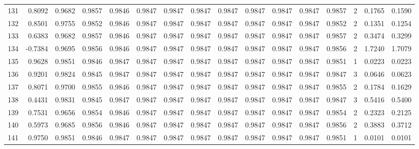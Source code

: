 \begin{tabular}{lrrrrrrrrrrrrrrr}
131 &      0.8092 &  0.9682 &  0.9857 &  0.9846 &  0.9847 &  0.9847 &  0.9847 &  0.9847 &  0.9847 &  0.9847 &   0.9847 &     0.9857 &      2 &                    0.1765 &                     0.1590 \\
132 &      0.8501 &  0.9755 &  0.9852 &  0.9846 &  0.9847 &  0.9847 &  0.9847 &  0.9847 &  0.9847 &  0.9847 &   0.9847 &     0.9852 &      2 &                    0.1351 &                     0.1254 \\
133 &      0.6383 &  0.9682 &  0.9857 &  0.9846 &  0.9847 &  0.9847 &  0.9847 &  0.9847 &  0.9847 &  0.9847 &   0.9847 &     0.9857 &      2 &                    0.3474 &                     0.3299 \\
134 &     -0.7384 &  0.9695 &  0.9856 &  0.9846 &  0.9847 &  0.9847 &  0.9847 &  0.9847 &  0.9847 &  0.9847 &   0.9847 &     0.9856 &      2 &                    1.7240 &                     1.7079 \\
135 &      0.9628 &  0.9851 &  0.9846 &  0.9847 &  0.9847 &  0.9847 &  0.9847 &  0.9847 &  0.9847 &  0.9847 &   0.9847 &     0.9851 &      1 &                    0.0223 &                     0.0223 \\
136 &      0.9201 &  0.9824 &  0.9845 &  0.9847 &  0.9847 &  0.9847 &  0.9847 &  0.9847 &  0.9847 &  0.9847 &   0.9847 &     0.9847 &      3 &                    0.0646 &                     0.0623 \\
137 &      0.8071 &  0.9700 &  0.9855 &  0.9846 &  0.9847 &  0.9847 &  0.9847 &  0.9847 &  0.9847 &  0.9847 &   0.9847 &     0.9855 &      2 &                    0.1784 &                     0.1629 \\
138 &      0.4431 &  0.9831 &  0.9845 &  0.9847 &  0.9847 &  0.9847 &  0.9847 &  0.9847 &  0.9847 &  0.9847 &   0.9847 &     0.9847 &      3 &                    0.5416 &                     0.5400 \\
139 &      0.7531 &  0.9656 &  0.9854 &  0.9846 &  0.9847 &  0.9847 &  0.9847 &  0.9847 &  0.9847 &  0.9847 &   0.9847 &     0.9854 &      2 &                    0.2323 &                     0.2125 \\
140 &      0.5973 &  0.9685 &  0.9856 &  0.9846 &  0.9847 &  0.9847 &  0.9847 &  0.9847 &  0.9847 &  0.9847 &   0.9847 &     0.9856 &      2 &                    0.3883 &                     0.3712 \\
141 &      0.9750 &  0.9851 &  0.9846 &  0.9847 &  0.9847 &  0.9847 &  0.9847 &  0.9847 &  0.9847 &  0.9847 &   0.9847 &     0.9851 &      1 &                    0.0101 &                     0.0101 \\

\end{tabular}
